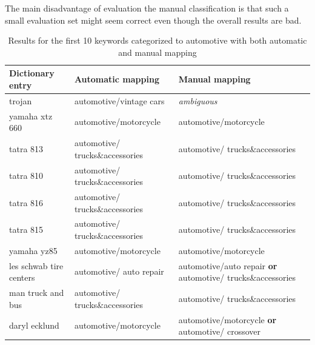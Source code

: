 The main disadvantage of evaluation the manual classification is that such a small evaluation set might seem correct even though the overall results are bad. 

\begin{table}[h]
\centering
\renewcommand{\arraystretch}{1.25}
\begin{tabularx}{\textwidth}{l|X|X}
{\bf Dictionary entry}  & {\bf Automatic mapping}          & {\bf Manual mapping}                                       \\ \hline
trojan                  & automotive/vintage cars          & {\it ambiguous}                                            \\ \hline
yamaha xtz 660          & automotive/motorcycle            & automotive/motorcycle                                      \\ \hline
tatra 813               & automotive/ trucks\&accessories & automotive/ trucks\&accessories                           \\ \hline
tatra 810               & automotive/ trucks\&accessories & automotive/ trucks\&accessories                           \\ \hline
tatra 816               & automotive/ trucks\&accessories & automotive/ trucks\&accessories                           \\ \hline
tatra 815               & automotive/ trucks\&accessories & automotive/ trucks\&accessories                           \\ \hline
yamaha yz85             & automotive/motorcycle            & automotive/motorcycle                                      \\ \hline
les schwab tire centers & automotive/ {auto repair}           & automotive/auto repair \textbf{or} automotive/ trucks\&accessories \\ \hline
man truck and bus       & automotive/ trucks\&accessories & automotive/ trucks\&accessories                           \\ \hline
daryl ecklund           & automotive/motorcycle            & automotive/motorcycle \textbf{or} automotive/ crossover              
\end{tabularx}
\caption[Comparison of manual and automatic mapping, automotive]{Results for the first 10 keywords categorized to automotive with both automatic and manual mapping}
\label{tab:manual_mapping_automotive_iab-1}
\end{table}

